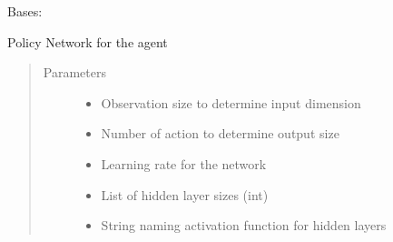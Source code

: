 \documentclass[letterpaper,10pt,english]{sphinxmanual}
\begin{document}
\begin{fulllineitems}
\label{\detokenize{agents.reinforcement_learning:agents.reinforcement_learning.ppo.PolicyNetwork}}
\sphinxAtStartPar
Bases: 

\sphinxAtStartPar
Policy Network for the agent
\begin{quote}\begin{description}
\item[{Parameters}] \leavevmode\begin{itemize}
\item {} 
\sphinxAtStartPar
{} \textendash{} Observation size to determine input dimension

\item {} 
\sphinxAtStartPar
{} \textendash{} Number of action to determine output size

\item {} 
\sphinxAtStartPar
{} \textendash{} Learning rate for the network

\item {} 
\sphinxAtStartPar
{} \textendash{} List of hidden layer sizes (int)

\item {} 
\sphinxAtStartPar
{} \textendash{} String naming activation function for hidden layers

\end{itemize}

\end{description}\end{quote}


\end{fulllineitems}
\end{document}
